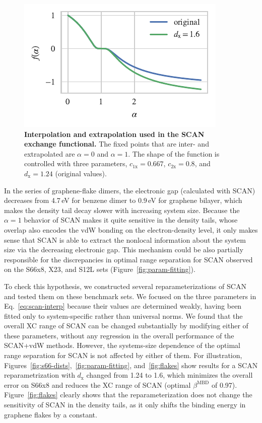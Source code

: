 \begin{figure}[t!]
\centering
\includegraphics{media/scan-interp}
\caption{\textbf{Interpolation and extrapolation used in the SCAN exchange functional.}
The fixed points that are inter- and extrapolated are $\alpha=0$ and $\alpha=1$.
The shape of the function is controlled with three parameters, $c_\mathrm{1x}=0.667$, $c_\mathrm{2x}=0.8$, and $d_\mathrm x=1.24$ (original values).
}\label{fig:scan-interp}
\end{figure}

In the series of graphene-flake dimers, the electronic gap (calculated with SCAN) decreases from 4.7\,eV for benzene dimer to 0.9\,eV for graphene bilayer, which makes the density tail decay slower with increasing system size.
Because the $\alpha=1$ behavior of SCAN makes it quite sensitive in the density tails, whose overlap also encodes the vdW bonding on the electron-density level, it only makes sense that SCAN is able to extract the nonlocal information about the system size via the decreasing electronic gap.
This mechanism could be also partially responsible for the discrepancies in optimal range separation for SCAN observed on the S66x8, X23, and S12L sets (Figure~\ref{fig:param-fitting}).

To check this hypothesis, we constructed several reparameterizations of SCAN and tested them on these benchmark sets.
We focused on the three parameters in Eq.~\ref{eq:scan-interp} because their values are determined weakly, having been fitted only to system-specific rather than universal norms.
We found that the overall XC range of SCAN can be changed substantially by modifying either of these parameters, without any regression in the overall performance of the SCAN+vdW methods.
However, the systems-size dependence of the optimal range separation for SCAN is not affected by either of them.
For illustration, Figures~\ref{fig:s66-dists},~\ref{fig:param-fitting}, and~\ref{fig:flakes} show results for a SCAN reparametrization with $d_\mathrm x$ changed from 1.24 to 1.6, which minimizes the overall error on S66x8 and reduces the XC range of SCAN (optimal $\beta^\text{MBD}$ of 0.97).
Figure~\ref{fig:flakes} clearly shows that the reparameterization does not change the sensitivity of SCAN in the density tails, as it only shifts the binding energy in graphene flakes by a constant.


